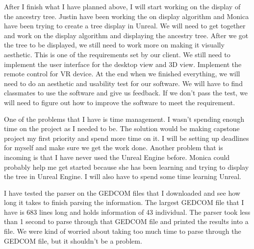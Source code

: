 \documentclass[onecolumn, draftclsnofoot, 10pt, compsoc]{IEEEtran}
\begin{document}
\begin{singlespace}
After I finish what I have planned above, I will start working on the display of the ancestry tree. Justin have been working the on display algorithm and Monica have been trying to create a tree display in Unreal. We will need to get together and work on the display algorithm and displaying the ancestry tree. After we got the tree to be displayed, we still need to work more on making it visually aesthetic. This is one of the requirements set by our client. We still need to implement the user interface for the desktop view and 3D view. Implement the remote control for VR device. At the end when we finished everything, we will need to do an aesthetic and usability test for our software. We will have to find classmates to use the software and give us feedback. If we don't pass the test, we will need to figure out how to improve the software to meet the requirement.

One of the problems that I have is time management. I wasn't spending enough time on the project as I needed to be. The solution would be making capstone project my first priority and spend more time on it. I will be setting up deadlines for myself and make sure we get the work done. Another problem that is incoming is that I have never used the Unreal Engine before. Monica could probably help me get started because she has been learning and trying to display the tree in Unreal Engine. I will also have to spend some time learning Unreal.  

I have tested the parser on the GEDCOM files that I downloaded and see how long it takes to finish parsing the information. The largest GEDCOM file that I have is 683 lines long and holds information of 43 individual. The parser took less than 1 second to parse through that GEDCOM file and printed the results into a file. We were kind of worried about taking too much time to parse through the GEDCOM file, but it shouldn't be a problem.
\end{singlespace}
\end{document}
